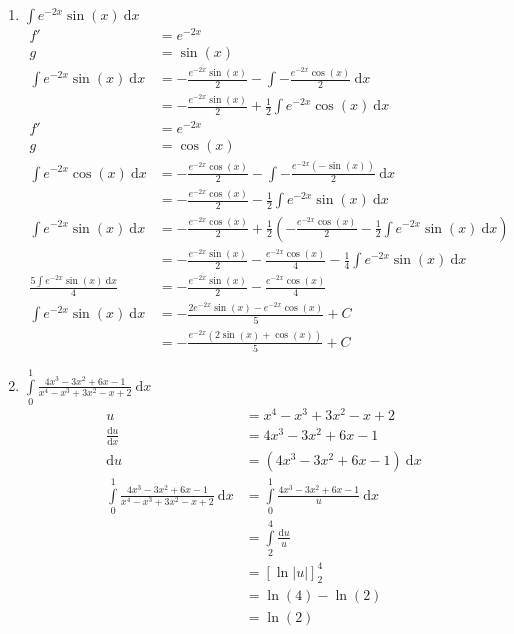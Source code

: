 \documentclass[10pt]{article}
\begin{document}
\begin{enumerate}[start=5,leftmargin=1in]
\begin{enumerate}
        \item $\int e^{-2x} \sin(x) \: \text{d}x$
        \begin{align*}
            f' &= e^{-2x} \\
            g &= \sin(x) \\
            \int e^{-2x} \sin(x) \: \text{d}x &= -\frac{e^{-2x} \sin(x)}{2} - \int -\frac{e^{-2x} \cos(x)}{2} \: \text{d}x \\
            &= -\frac{e^{-2x} \sin(x)}{2} + \frac{1}{2} \int e^{-2x} \cos(x) \: \text{d}x \\
            f' &= e^{-2x} \\
            g &= \cos(x) \\
            \int e^{-2x} \cos(x) \: \text{d}x &= -\frac{e^{-2x} \cos(x)}{2} - \int -\frac{e^{-2x} (-\sin(x))}{2} \: \text{d}x \\
            &= -\frac{e^{-2x} \cos(x)}{2} - \frac{1}{2} \int e^{-2x} \sin(x) \: \text{d}x \\
            \int e^{-2x} \sin(x) \: \text{d}x &= -\frac{e^{-2x} \cos(x)}{2}  + \frac{1}{2} \left(- \frac{e^{-2x} \cos(x)}{2} - \frac{1}{2} \int e^{-2x} \sin(x) \: \text{d}x\right) \\
            &= -\frac{e^{-2x} \sin(x)}{2} - \frac{e^{-2x} \cos(x)}{4} - \frac{1}{4} \int e^{-2x} \sin(x) \: \text{d}x \\
            \frac{5\int e^{-2x} \sin(x) \: \text{d}x}{4} &= -\frac{e^{-2x} \sin(x)}{2} - \frac{e^{-2x} \cos(x)}{4} \\
            \int e^{-2x} \sin(x) \: \text{d}x &= -\frac{2e^{-2x} \sin(x) - e^{-2x} \cos(x)}{5} + C \\
            &= -\frac{e^{-2x}(2\sin(x) + \cos(x))}{5} + C
        \end{align*}

        \item $\int\limits_0^1 \frac{4x^{3} - 3x^{2} + 6x - 1}{x^{4} - x^{3} + 3x^{2} - x + 2} \: \text{d}x$
        \begin{align*}
            u &= x^{4} - x^{3} + 3x^{2} - x + 2 \\
            \frac{\text{d}u}{\text{d}x} &= 4x^{3} - 3x^{2} + 6x - 1 \\
            \text{d}u &= (4x^{3} - 3x^{2} + 6x - 1) \: \text{d}x \\
            \int\limits_0^1 \frac{4x^{3} - 3x^{2} + 6x - 1}{x^{4} - x^{3} + 3x^{2} - x + 2} \: \text{d}x &= \int\limits_0^1 \frac{4x^{3} - 3x^{2} + 6x - 1}{u} \: \text{d}x \\
            &= \int\limits_2^4 \frac{\text{d}u}{u} \\
            &= [\ln|u|]_2^4 \\
            &= \ln(4) - \ln(2) \\
            &= \ln(2)
        \end{align*}


\end{enumerate}
\end{enumerate}
\end{document}
